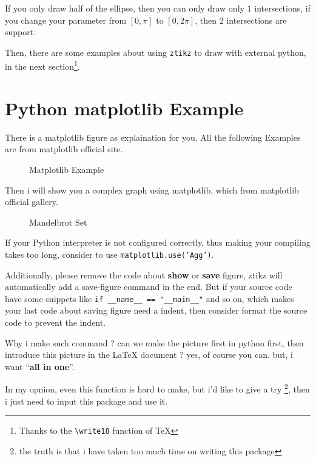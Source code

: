 \documentclass[lang=en, layout=oneside]{zlatex}
\begin{document}
\begin{remark}
    \upshape
    If you only draw half of the ellipse, then you can only draw only 1 intersections,
    if you change your parameter from $[0, \pi]$ to $[0, 2\pi]$, then 2 intersections
    are support. 
\end{remark}

Then, there are some examples about using \texttt{ztikz} to draw with external python,
in the next section\footnote[1]{Thanks to the \texttt{\textbackslash write18} function of \TeX{}}.


\section{Python matplotlib Example}
There is a matplotlib figure as explaination for you. All the following Examples are from 
matplotlib official site.

\begin{figure}[!htb]
    \centering
    
    \caption{Matplotlib Example}
\end{figure}

Then i will show you a complex graph using matplotlib, which from matplotlib official
gallery.

\begin{figure}[!htb]
    \centering
    
    \caption{Mandelbrot Set}
\end{figure}

\begin{remark}\upshape
    If your Python interpreter is not configured correctly, thus making 
    your compiling takes too long, consider to use \texttt{matplotlib.use('Agg')}.

    Additionally, please remove the code about \textbf{show} or \textbf{save} figure,
    ztikz will automatically add a save-figure command in the end. But if your source code 
    have some snippets like \texttt{if \_\_name\_\_ == "\_\_main\_\_"} and so on, which makes your 
    last code about saving figure need a indent, then consider format the source code to 
    prevent the indent.   
\end{remark}

Why i make such command ? can we make the picture first in python first, then introduce this 
picture in the \LaTeX{} document ? yes, of course you can. but, i want ``\textbf{all in one}''.

In my opnion, even this function is hard to make, but i'd like to give a try 
\footnote[2]{the truth is that i have taken too much time on writing this package}, 
then i just need to input this package and use it. 
\end{document}
